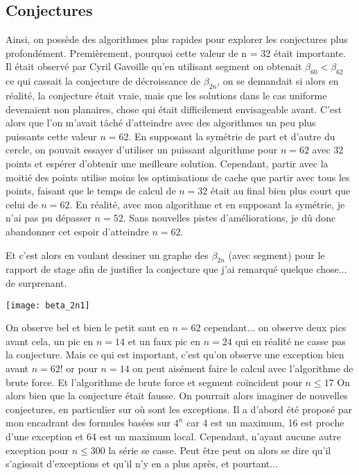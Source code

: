 \subsection{Conjectures}

Ainsi, on possède des algorithmes plus rapides pour explorer les conjectures plus profondément. Premièrement, pourquoi cette valeur de n = 32 était importante. Il était observé par Cyril Gavoille qu'en utilisant segment on obtenait $\beta_{60} < \beta_{62}$ ce qui cassait la conjecture de décroissance de $\beta_{2n}$, on se demandait si alors en réalité, la conjecture était vraie, mais que les solutions dans le cas uniforme devenaient non planaires, chose qui était difficilement envisageable avant. C'est alors que l'on m'avait tâché d'atteindre avec des algorithmes un peu plus puissants cette valeur $n = 62$. En supposant la symétrie de part et d'autre du cercle, on pouvait essayer d'utiliser un puissant algorithme pour $n = 62$ avec 32 points et espérer d'obtenir une meilleure solution. Cependant, partir avec la moitié des points utilise moins les optimisations de cache que partir avec tous les points, faisant que le temps de calcul de $n = 32$ était au final bien plus court que celui de $n = 62$. En réalité, avec mon algorithme et en supposant la symétrie, je n'ai pas pu dépasser $n = 52$. Sans nouvelles pistes d'améliorations, je dû donc abandonner cet espoir d'atteindre $n = 62$.

Et c'est alors en voulant dessiner un graphe des $\beta_{2n}$ (avec segment) pour le rapport de stage afin de justifier la conjecture que j'ai remarqué quelque chose... de surprenant.

\texttt{[image: beta\_2n1]}

On observe bel et bien le petit saut en $n = 62$
cependant... on observe deux pics avant cela, un pic en $n = 14$ et un faux pic en $n = 24$ qui en réalité ne casse pas la conjecture. Mais ce qui est important, c'est qu'on observe une exception bien avant $n = 62$! or pour $n = 14$ on peut aisément faire le calcul avec l'algorithme de brute force. Et l'algorithme de brute force et segment coïncident pour $n \leq 17$
On alors bien que la conjecture était fausse. On pourrait alors imaginer de nouvelles conjectures, en particulier sur où sont les exceptions. Il a d'abord été proposé par mon encadrant des formules basées sur $4^n$ car 4 est un maximum, 16 est proche d'une exception et 64 est un maximum local. Cependant, n'ayant aucune autre exception pour $n \leq 300$ la série se casse. Peut être peut on alors se dire qu'il s'agissait d'exceptions et qu'il n'y en a plus après, et pourtant...


